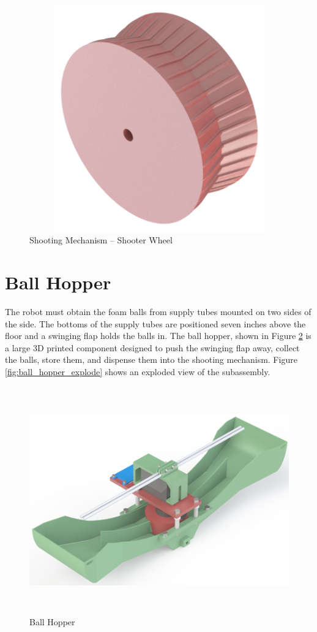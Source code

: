 \begin{figure}[H]   %
	\centering \includegraphics[width=6in, height=3.85in, keepaspectratio]{figures/shooter_wheel.png}
	\caption{Shooting Mechanism -- Shooter Wheel}	\label{fig:shooter_wheel}
\end{figure}

\section{Ball Hopper}
The robot must obtain the foam balls from supply tubes mounted on two sides of the side. The bottoms of the supply tubes are positioned seven inches above the floor and a swinging flap holds the balls in. The ball hopper, shown in Figure \ref{fig:ball_hopper} is a large 3D printed component designed to push the swinging flap away, collect the balls, store them, and dispense them into the shooting mechanism. Figure \ref{fig:ball_hopper_explode} shows an exploded view of the subassembly.

\begin{figure}[H]   %
	\centering \includegraphics[width=6in, height=3.85in, keepaspectratio]{figures/ball_hopper.png}
	\caption{Ball Hopper}	\label{fig:ball_hopper}
\end{figure}

